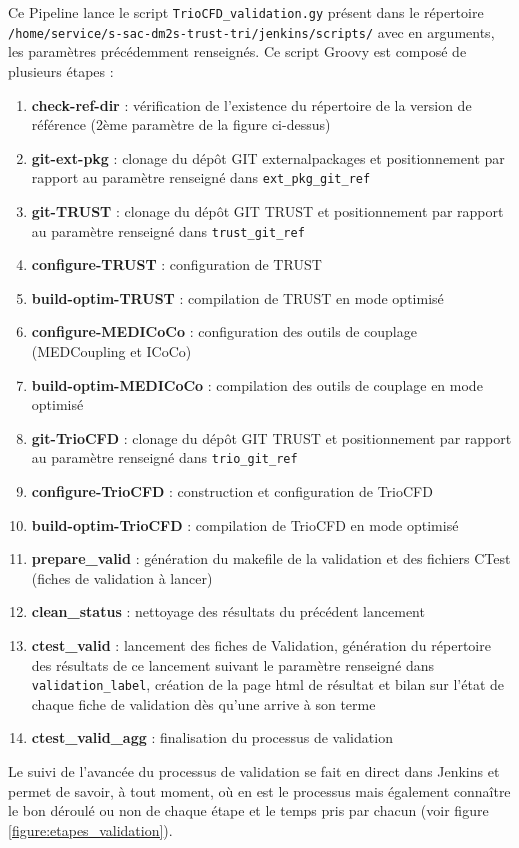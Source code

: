 Ce Pipeline lance le script \texttt{TrioCFD\_validation.gy} présent dans le répertoire \texttt{/home/service/s-sac-dm2s-trust-tri/jenkins/scripts/} avec en arguments,
les paramètres précédemment renseignés.
Ce script Groovy est composé de plusieurs étapes :
\begin{enumerate}
\item \textbf{check-ref-dir} : vérification de l'existence du répertoire de la version de référence (2ème paramètre de la figure ci-dessus)
\item \textbf{git-ext-pkg} : clonage du dépôt GIT externalpackages et positionnement par rapport au paramètre renseigné dans \texttt{ext\_pkg\_git\_ref}
\item \textbf{git-TRUST} : clonage du dépôt GIT TRUST et positionnement par rapport au paramètre renseigné dans \texttt{trust\_git\_ref}
\item \textbf{configure-TRUST} : configuration de TRUST
\item \textbf{build-optim-TRUST} : compilation de TRUST en mode optimisé
\item \textbf{configure-MEDICoCo} : configuration des outils de couplage (MEDCoupling et ICoCo)
\item \textbf{build-optim-MEDICoCo} : compilation des outils de couplage en mode optimisé
\item \textbf{git-TrioCFD} : clonage du dépôt GIT TRUST et positionnement par rapport au paramètre renseigné dans \texttt{trio\_git\_ref}
\item \textbf{configure-TrioCFD} : construction et configuration de TrioCFD
\item \textbf{build-optim-TrioCFD} : compilation de TrioCFD en mode optimisé
\item \textbf{prepare\_valid} : génération du makefile de la validation et des fichiers CTest (fiches de validation à lancer)
\item \textbf{clean\_status} : nettoyage des résultats du précédent lancement
\item \textbf{ctest\_valid} : lancement des fiches de Validation, génération du répertoire des résultats de ce lancement suivant le paramètre renseigné dans \texttt{validation\_label}, création de la page html de résultat et bilan sur l'état de chaque fiche de validation dès qu'une arrive à son terme
\item \textbf{ctest\_valid\_agg} : finalisation du processus de validation
\end{enumerate}

Le suivi de l'avancée du processus de validation se fait en direct dans Jenkins et permet de savoir,
à tout moment, où en est le processus mais également connaître le bon déroulé ou non
de chaque étape et le temps pris par chacun (voir figure \ref{figure:etapes_validation}).

